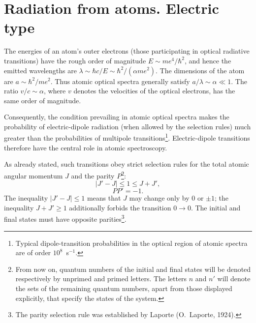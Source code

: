 \section[Radiation from atoms. Electric type]{Radiation from atoms. Electric type\protect\footnotemark}

The energies of an atom's outer electrons (those participating in optical radiative transitions) have the rough order of magnitude $E\sim me^4/\hbar^2$, and hence the emitted wavelengths are $\lambda\sim\hbar c/E\sim\hbar^2/(\alpha me^2)$. The dimensions of the atom are $a\sim\hbar^2/me^2$. Thus atomic optical spectra generally satisfy $a/\lambda\sim\alpha\ll1$. The ratio $v/c\sim\alpha$, where $v$ denotes the velocities of the optical electrons, has the same order of magnitude.

Consequently, the condition prevailing in atomic optical spectra makes the probability of electric-dipole radiation (when allowed by the selection rules) much greater than the probabilities of multipole transitions\footnote{Typical dipole-transition probabilities in the optical region of atomic spectra are of order $10^8$~s$^{-1}$.}. Electric-dipole transitions therefore have the central role in atomic spectroscopy.

As already stated, such transitions obey strict selection rules for the total atomic angular momentum $J$ and the parity $P$\footnote{From now on, quantum numbers of the initial and final states will be denoted respectively by unprimed and primed letters. The letters $n$ and $n'$ will denote the sets of the remaining quantum numbers, apart from those displayed explicitly, that specify the states of the system.}:
\begin{equation}
|J'-J|\leq1\leq J+J',
\tag{49.1}
\end{equation}
\begin{equation}
PP'=-1.
\tag{49.2}
\end{equation}
The inequality $|J'-J|\leq1$ means that $J$ may change only by $0$ or $\pm1$; the inequality $J+J'\geq1$ additionally forbids the transition $0\to0$. The initial and final states must have opposite parities\footnote{The parity selection rule was established by Laporte (O.~Laporte, 1924).}.

